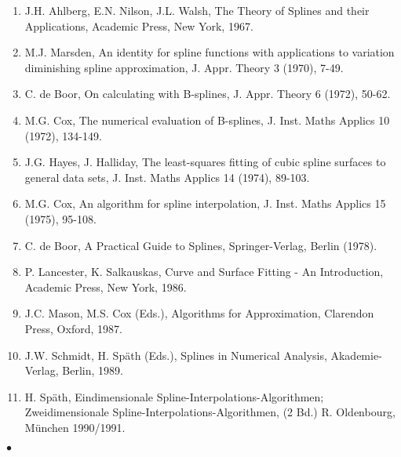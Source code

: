 \begin{enumerate}
\item J.H. Ahlberg, E.N. Nilson, J.L. Walsh, The Theory of Splines and
 their Applications, Academic Press, New York, 1967.
\item M.J. Marsden, An identity for spline functions with applications
 to variation diminishing spline approximation,
 J. Appr. Theory 3 (1970), 7-49.
\item C. de Boor, On calculating with B-splines,
 J. Appr. Theory 6 (1972), 50-62.
\item M.G. Cox, The numerical evaluation of B-splines,
 J. Inst. Maths Applics 10 (1972), 134-149.
\item J.G. Hayes, J. Halliday, The least-squares fitting of cubic spline
 surfaces to general data sets,
 J. Inst. Maths Applics 14 (1974), 89-103.
\item M.G. Cox, An algorithm for spline interpolation,
 J. Inst. Maths Applics 15 (1975), 95-108.
\item C. de Boor, A Practical Guide to Splines,
 Springer-Verlag, Berlin (1978).
\item P. Lancester, K. Salkauskas, Curve and Surface Fitting - An
 Introduction, Academic Press, New York, 1986.
\item J.C. Mason, M.S. Cox (Eds.), Algorithms for Approximation,
 Clarendon Press, Oxford, 1987.
\item J.W. Schmidt, H. Sp\"ath (Eds.), Splines in Numerical Analysis,
 Akademie-Verlag, Berlin, 1989.
\item H. Sp\"ath, Eindimensionale Spline-Interpolations-Algorithmen;
Zweidimensionale Spline-Interpola\-tions-Algorithmen, (2 Bd.)
 R. Oldenbourg, M\"unchen 1990/1991.
\end{enumerate}
$\bullet$
